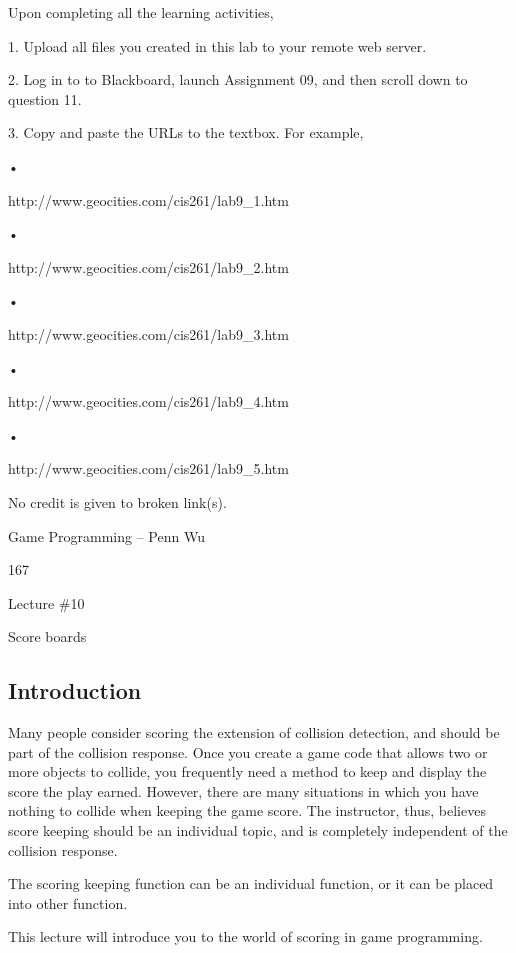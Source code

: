 \documentclass[
]{article}
\begin{document}
Upon completing all the learning activities,

1. Upload all files you created in this lab to your remote web server.

2. Log in to to Blackboard, launch Assignment 09, and then scroll down
to question 11.

3. Copy and paste the URLs to the textbox. For example,

•

http://www.geocities.com/cis261/lab9\_1.htm

•

http://www.geocities.com/cis261/lab9\_2.htm

•

http://www.geocities.com/cis261/lab9\_3.htm

•

http://www.geocities.com/cis261/lab9\_4.htm

•

http://www.geocities.com/cis261/lab9\_5.htm

No credit is given to broken link(s).

Game Programming -- Penn Wu

167

\protect\hypertarget{index_split_010.htmlux5cux23p168}{}{}

Lecture \#10

Score boards

\protect\hypertarget{index_split_011.html}{}{}

\hypertarget{index_split_011.htmlux5cux23calibre_pb_10}{%
\subsection{Introduction}\label{index_split_011.htmlux5cux23calibre_pb_10}}

Many people consider scoring the extension of collision detection, and
should be part of the collision response. Once you create a game code
that allows two or more objects to collide, you frequently need a method
to keep and display the score the play earned. However, there are many
situations in which you have nothing to collide when keeping the game
score. The instructor, thus, believes score keeping should be an
individual topic, and is completely independent of the collision
response.

The scoring keeping function can be an individual function, or it can be
placed into other function.

This lecture will introduce you to the world of scoring in game
programming.
\end{document}
